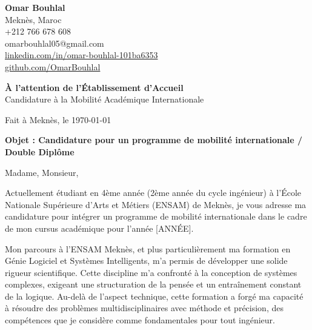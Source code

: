 \documentclass[11pt,a4paper]{article}
\begin{document}
{\bfseries Omar Bouhlal} \\
Meknès, Maroc \\
+212 766 678 608 \\
omarbouhlal05@gmail.com \\
\href{https://linkedin.com/in/omar-bouhlal-101ba6353}{linkedin.com/in/omar-bouhlal-101ba6353} \\
\href{https://github.com/OmarBouhlal}{github.com/OmarBouhlal}

\vspace{1.5em}

\hfill {\bfseries À l'attention de l'Établissement d'Accueil} \\
\hfill Candidature à la Mobilité Académique Internationale

\vspace{1em}

Fait à Meknès, le \today

\vspace{1em}

{\bfseries Objet : Candidature pour un programme de mobilité internationale / Double Diplôme}

\vspace{1.5em}

Madame, Monsieur,

Actuellement étudiant en 4ème année (2ème année du cycle ingénieur) à l'École Nationale Supérieure d'Arts et Métiers (ENSAM) de Meknès, je vous adresse ma candidature pour intégrer un programme de mobilité internationale dans le cadre de mon cursus académique pour l'année [ANNÉE].

Mon parcours à l'ENSAM Meknès, et plus particulièrement ma formation en Génie Logiciel et Systèmes Intelligents, m'a permis de développer une solide rigueur scientifique. Cette discipline m'a confronté à la conception de systèmes complexes, exigeant une structuration de la pensée et un entraînement constant de la logique. Au-delà de l'aspect technique, cette formation a forgé ma capacité à résoudre des problèmes multidisciplinaires avec méthode et précision, des compétences que je considère comme fondamentales pour tout ingénieur.
\end{document}
